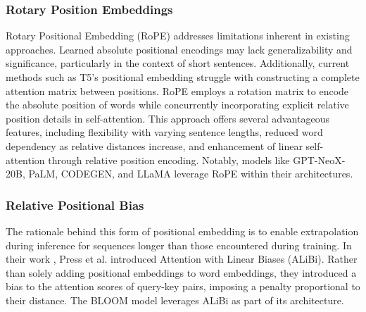 \subsubsection*{Rotary Position Embeddings}

Rotary Positional Embedding (RoPE) \cite{su2023roformer} addresses limitations inherent in existing approaches. Learned absolute positional encodings may lack generalizability and significance, particularly in the context of short sentences. Additionally, current methods such as T5's positional embedding struggle with constructing a complete attention matrix between positions. RoPE employs a rotation matrix to encode the absolute position of words while concurrently incorporating explicit relative position details in self-attention. This approach offers several advantageous features, including flexibility with varying sentence lengths, reduced word dependency as relative distances increase, and enhancement of linear self-attention through relative position encoding. Notably, models like GPT-NeoX-20B, PaLM, CODEGEN, and LLaMA leverage RoPE within their architectures.

\subsubsection*{Relative Positional Bias}

The rationale behind this form of positional embedding is to enable extrapolation during inference for sequences longer than those encountered during training. In their work \cite{press2022train}, Press et al. introduced Attention with Linear Biases (ALiBi). Rather than solely adding positional embeddings to word embeddings, they introduced a bias to the attention scores of query-key pairs, imposing a penalty proportional to their distance. The BLOOM \cite{workshop2023bloom} model leverages ALiBi as part of its architecture.

